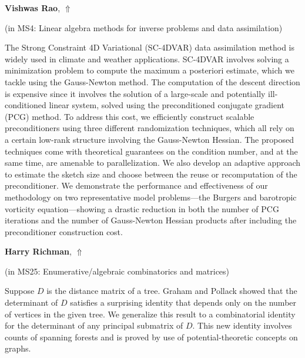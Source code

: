 \documentclass[ILAS2025-program.tex]{subfiles}
\begin{document}
\hypertarget{down0356}{}\begin{ilasabstract}
    
\textbf{Vishwas Rao},  \hfill \hyperlink{up0356}{$\Uparrow$}
    
    
(in {\color{mstitle}MS4: Linear algebra methods for inverse problems and data assimilation})
        
\mtskip
    The Strong Constraint 4D Variational (SC-4DVAR) data assimilation method is widely used in climate and weather applications. 
%
SC-4DVAR involves solving a minimization problem to compute the maximum a posteriori estimate, which we tackle using the Gauss-Newton method. 
%
The computation of the descent direction is expensive since it involves the solution of a large-scale and potentially ill-conditioned linear system, solved using the preconditioned conjugate gradient (PCG) method. 
%
To address this cost, we efficiently construct scalable preconditioners using three different randomization techniques, which all rely on a certain low-rank structure involving the Gauss-Newton Hessian. 
%
The proposed techniques come with theoretical guarantees on the condition number, and at the same time, are amenable to parallelization.
%
We also develop an adaptive approach to estimate the sketch size and choose between the reuse or recomputation of the preconditioner. 
% 
We demonstrate the performance and effectiveness of our methodology on two representative model problems---the Burgers and barotropic vorticity equation---showing a drastic reduction in both the number of PCG iterations and the number of Gauss-Newton Hessian products after including the preconditioner construction cost.
\end{ilasabstract}
    

\hypertarget{down0182}{}\begin{ilasabstract}
    
\textbf{Harry Richman},  \hfill \hyperlink{up0182}{$\Uparrow$}
    
    
(in {\color{mstitle}MS25: Enumerative/algebraic combinatorics and matrices})
        
\mtskip
    Suppose $D$ is the distance matrix of a tree. 
Graham and Pollack showed that the determinant of $D$ satisfies a surprising identity that depends only on the number of vertices in the given tree.
We generalize this result to a combinatorial identity for the determinant of any principal submatrix of $D$.
This new identity involves counts of spanning forests and is proved by use of potential-theoretic concepts on graphs.

\end{ilasabstract}
    
\end{document}
